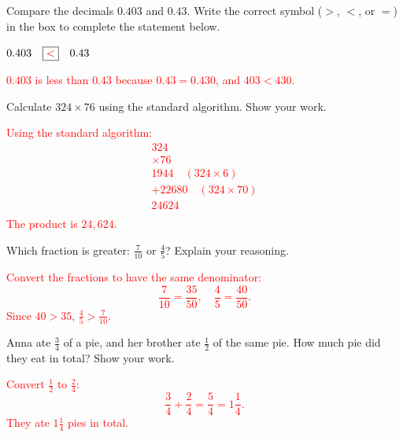 \documentclass[12pt]{article}
\begin{document}
\begin{tcolorbox}[colframe=black!50, colback=white, title=\textbf{Problem 3 (5.NBT.A.3)}]
Compare the decimals \(0.403\) and \(0.43\). Write the correct symbol (\(>\), \(<\), or \(=\)) in the box to complete the statement below.

\begin{center}
    \Large
    \(0.403 \quad \boxed{\textcolor{red}{<}} \quad 0.43\)
\end{center}

\textcolor{red}{\(0.403\) is less than \(0.43\) because \(0.43 = 0.430\), and \(403 < 430\).}
\end{tcolorbox}

\begin{tcolorbox}[colframe=black!50, colback=white, title=\textbf{Problem 4 (5.NBT.A.5)}]
Calculate \(324 \times 76\) using the standard algorithm. Show your work.

\textcolor{red}{Using the standard algorithm:  
\[
\begin{array}{r}
   324 \\
 \times 76 \\
\hline
 1944 \quad (\text{324} \times 6) \\
+22680 \quad (\text{324} \times 70) \\
\hline
 24624 \\
\end{array}
\]  
The product is \(24,624\).}
\end{tcolorbox}

\begin{tcolorbox}[colframe=black!50, colback=white, title=\textbf{Problem 5 (5.NBT.A.3)}]
Which fraction is greater: \( \frac{7}{10} \) or \( \frac{4}{5} \)? Explain your reasoning.

\textcolor{red}{Convert the fractions to have the same denominator:  
\[
\frac{7}{10} = \frac{35}{50}, \quad \frac{4}{5} = \frac{40}{50}.
\]  
Since \(40 > 35\), \( \frac{4}{5} > \frac{7}{10}\).}
\end{tcolorbox}

\begin{tcolorbox}[colframe=black!50, colback=white, title=\textbf{Problem 6 (5.NF.A.2)}]
Anna ate \( \frac{3}{4} \) of a pie, and her brother ate \( \frac{1}{2} \) of the same pie. How much pie did they eat in total? Show your work.

\textcolor{red}{Convert \( \frac{1}{2} \) to \( \frac{2}{4} \):  
\[
\frac{3}{4} + \frac{2}{4} = \frac{5}{4} = 1\frac{1}{4}.
\]  
They ate \(1\frac{1}{4}\) pies in total.}
\end{tcolorbox}
\end{document}
